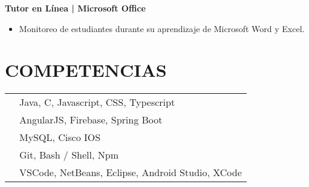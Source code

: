 \documentclass{res}
\begin{document}
\begin{resume}
    \textbf{Tutor en Línea | Microsoft Office} \jump
    \begin{itemize}
        \item Monitoreo de estudiantes durante su aprendizaje de Microsoft Word y Excel.
    \end{itemize}

    \longjump

    \section{\large{COMPETENCIAS}} \jump\jump\jump
    \begin{tabularx}{15cm}{SB}
         &
        Java, C, Javascript, CSS, Typescript
        \\
         &
        AngularJS, Firebase, Spring Boot
        \\
         &
        MySQL, Cisco IOS
        \\
         &
        Git, Bash / Shell, Npm
        \\
         &
        VSCode, NetBeans, Eclipse, Android Studio, XCode
    \end{tabularx}
\end{resume}
\end{document}
